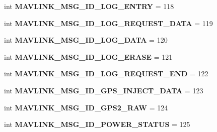 \begin{DoxyCompactItemize}
int {\bfseries M\+A\+V\+L\+I\+N\+K\+\_\+\+M\+S\+G\+\_\+\+I\+D\+\_\+\+L\+O\+G\+\_\+\+E\+N\+T\+RY} = 118
\item 
\mbox{\label{namespacepymavlink_1_1dialects_1_1v10_a12c69c9c62c64ecc8e4f033cbb954a6c}} 
int {\bfseries M\+A\+V\+L\+I\+N\+K\+\_\+\+M\+S\+G\+\_\+\+I\+D\+\_\+\+L\+O\+G\+\_\+\+R\+E\+Q\+U\+E\+S\+T\+\_\+\+D\+A\+TA} = 119
\item 
\mbox{\label{namespacepymavlink_1_1dialects_1_1v10_a6f68221fefa6d7ae100f2e618687ad5a}} 
int {\bfseries M\+A\+V\+L\+I\+N\+K\+\_\+\+M\+S\+G\+\_\+\+I\+D\+\_\+\+L\+O\+G\+\_\+\+D\+A\+TA} = 120
\item 
\mbox{\label{namespacepymavlink_1_1dialects_1_1v10_aaec468f3e6e110da35240fcb5302a9c4}} 
int {\bfseries M\+A\+V\+L\+I\+N\+K\+\_\+\+M\+S\+G\+\_\+\+I\+D\+\_\+\+L\+O\+G\+\_\+\+E\+R\+A\+SE} = 121
\item 
\mbox{\label{namespacepymavlink_1_1dialects_1_1v10_a7ed17468a28727d1c3f79781160f5afd}} 
int {\bfseries M\+A\+V\+L\+I\+N\+K\+\_\+\+M\+S\+G\+\_\+\+I\+D\+\_\+\+L\+O\+G\+\_\+\+R\+E\+Q\+U\+E\+S\+T\+\_\+\+E\+ND} = 122
\item 
\mbox{\label{namespacepymavlink_1_1dialects_1_1v10_a45ad53373c69cb3390ed1a2c8af84765}} 
int {\bfseries M\+A\+V\+L\+I\+N\+K\+\_\+\+M\+S\+G\+\_\+\+I\+D\+\_\+\+G\+P\+S\+\_\+\+I\+N\+J\+E\+C\+T\+\_\+\+D\+A\+TA} = 123
\item 
\mbox{\label{namespacepymavlink_1_1dialects_1_1v10_a9250a5db9b3fdb7c578de4cc790ac671}} 
int {\bfseries M\+A\+V\+L\+I\+N\+K\+\_\+\+M\+S\+G\+\_\+\+I\+D\+\_\+\+G\+P\+S2\+\_\+\+R\+AW} = 124
\item 
\mbox{\label{namespacepymavlink_1_1dialects_1_1v10_a92247d00e89169e1b60a678dbc3846ce}} 
int {\bfseries M\+A\+V\+L\+I\+N\+K\+\_\+\+M\+S\+G\+\_\+\+I\+D\+\_\+\+P\+O\+W\+E\+R\+\_\+\+S\+T\+A\+T\+US} = 125
\item 
\mbox{\label{namespacepymavlink_1_1dialects_1_1v10_a8ae3ec0d663cb5d9900b22c471760ee9}} 

\end{DoxyCompactItemize}
